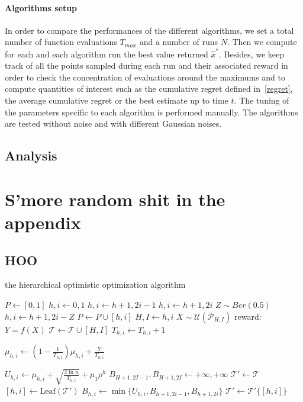 \documentclass[a4paper,10pt]{article}
\begin{document}
\paragraph{Algorithms setup}
In order to compare the performances of the different algorithms, we set a total number of function evaluations $T_{max}$ and a number of runs $N$. Then we compute for each and each algorithm run the best value returned $\widehat{x}^*$. Besides, we keep track of all the points sampled during each run and their associated reward in order to check the concentration of evaluations around the maximums and to compute quantities of interest such as the cumulative regret defined in~\ref{regret}, the average cumulative regret or the best estimate up to time $t$. The tuning of the parameters specific to each algorithm is performed manually. The algorithms are tested without noise and with different Gaussian noises.



\subsection{Analysis}

\appendix
\section{S'more random shit in the appendix}
\subsection{HOO}
\begin{algorithm}[!Htop]
	\small
\caption{the hierarchical optimistic optimization algorithm}
\begin{algorithmic}[1]
		\State $P \gets {[0,1]}$
		\State $h,i\gets 0,1$
				\State $h,i \gets h+1,2i-1 $
				\State $h,i \gets h+1,2i $
			\Else
				\State $Z \sim Ber(0.5)$
				\State $h,i \gets h+1,2i-Z$
			\EndIf
			\State $P \gets P \cup {[h,i]}$
		\EndWhile
		\State $H,I \gets h,i$
		\State $X \sim \mathcal{U}(\mathcal{P}_{H,I})$
		\State reward: $Y = f(X)$
		\State $\mathcal{T} \gets \mathcal{T} \cup {[H,I]}$
			\State $T_{h,i} \gets T_{h,i}+1$
			\begin{large}
			\State $\mu_{h,i}\gets (1-\frac{1}{T_{h,i}})\mu_{h,i}+\frac{Y}{T_{h,i}}$
			\end{large}
		\EndFor
			\State $U_{h,i}\gets \mu_{h,i}+\sqrt{\frac{2\ln n}{T_{h,i}}}+\mu_1 \rho^h$
		\EndFor
		\State $B_{H+1,2I-1},B_{H+1,2I} \gets +\infty,+\infty$
		\State $\mathcal{T}' \gets \mathcal{T}$
			\State $[h,i] \gets \text{Leaf}(\mathcal{T}')$
			\State $B_{h,i} \gets \min\{U_{h,i},B_{h+1,2i-1},B_{h+1,2i}\}$
			\State $\mathcal{T}' \gets \mathcal{T}'\{[h,i]\}$
		\EndWhile
	\EndFor
\end{algorithmic}
\end{algorithm}
\end{document}
